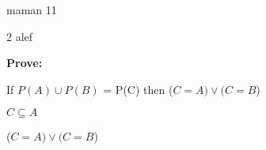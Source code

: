 \documentclass[a4paper,12pt]{article}
\begin{document}
{\Huge maman 11}

{\Large 2 alef}

\textbf{Prove:} 

If $P(A) \cup P(B)$ = P(C) then ($C=A) \vee (C=B$)

\hrulefill

$C \subseteq A$

($C=A) \vee (C=B$)
\end{document}
